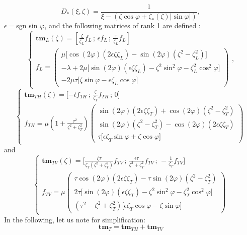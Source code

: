 \begin{equation}
D_*(\xi,\zeta)=\frac{1}{\xi-(\zeta \cos \varphi + \zeta_*(\zeta) |\sin \varphi|)},
\end{equation}
$\epsilon=$sgn sin $\varphi$, and the following matrices of rank 1 are defined :
\begin{equation}
\left\{
\begin{matrix}
\textbf{tm}_L(\zeta)=\left[ \frac{\zeta}{\zeta_L} f_L\,; \, \epsilon f_L\,;  \, \frac{\tau}{\zeta_L}f_L
\right] \\
f_L = \begin{pmatrix}
\mu \lbrack \cos(2\varphi)(2\epsilon\zeta\zeta_L)-\sin(2\varphi)(\zeta^2-\zeta_L^2) \rbrack\\
-\lambda+2\mu \lbrack \sin(2\varphi)(\epsilon\zeta\zeta_L)-\zeta^2\sin^2\varphi-\zeta^2_L\cos^2\varphi\rbrack\\
-2\mu\tau\lbrack \zeta\sin\varphi -\epsilon\zeta_L\cos\varphi\rbrack
\end{pmatrix}
\end{matrix}
\right. ,
\label{C4:tmL}
\end{equation}
\begin{equation}
\left\{
\begin{matrix}
\textbf{tm}_{TH}(\zeta)=\lbrack -tf_{TH}\,;\, \frac{\zeta}{\zeta_T}f_{TH}\,;\, 0 \rbrack\\
f_{TH}=\mu\left(1+\frac{\tau^2}{\zeta^2+\zeta_T^2}\right) \begin{pmatrix}
\sin(2\varphi)(2\epsilon\zeta\zeta_T)+\cos(2\varphi)(\zeta^2-\zeta_T^2)\\
\sin(2\varphi)(\zeta^2-\zeta_T^2)-\cos(2\varphi)(2\epsilon\zeta\zeta_T)\\
\tau\lbrack \epsilon\zeta_T\sin\varphi+\zeta\cos\varphi\rbrack 
\end{pmatrix}
\end{matrix}
\right.
\label{C4:tmTH}
\end{equation}
and
\begin{equation}
\left\{
\begin{matrix}
\textbf{tm}_{TV}(\zeta)=\lbrack \frac{\zeta\tau}{\zeta_T(\zeta^2+\zeta_T^2)}f_{TV}\,;\, \frac{\epsilon\tau}{\zeta^2+\zeta_T^2}f_{TV}\,;\, -\frac{1}{\zeta_T}f_{TV} \rbrack\\
f_{TV}=\mu\begin{pmatrix}
\tau\cos(2\varphi)(2\epsilon\zeta\zeta_T)-\tau\sin(2\varphi)(\zeta^2-\zeta_T^2)\\
2\tau\lbrack \sin(2\varphi)(\epsilon\zeta\zeta_T)-\zeta^2\sin^2\varphi-\zeta_T^2\cos^2\varphi\rbrack\\
\left(\tau^2-\zeta^2+\zeta_T^2\right)\lbrack \epsilon\zeta_T\cos\varphi-\zeta\sin\varphi \rbrack
\end{pmatrix}
\end{matrix}
\right.
\label{C4:tmTV}
\end{equation}
In the following, let us note for simplification:
\begin{equation}
\mathbf{tm}_T=\mathbf{tm}_{TH}+\mathbf{tm}_{TV}
\end{equation}


